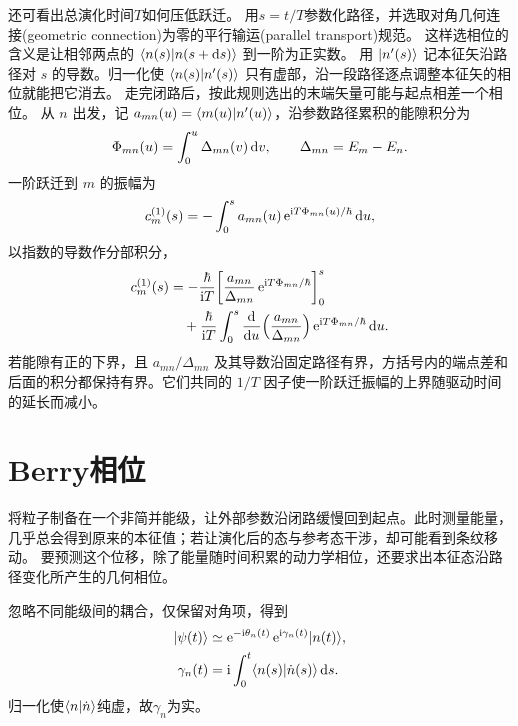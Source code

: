 还可看出总演化时间$T$如何压低跃迁。
用$s = t/T$参数化路径，并选取对角几何连接(geometric connection)为零的平行输运(parallel transport)规范。
这样选相位的含义是让相邻两点的 $\langle n(s)\vert n(s + \mathop{}\!\mathrm{d} s)\rangle$ 到一阶为正实数。
用 $\lvert n'(s)\rangle$ 记本征矢沿路径对 $s$ 的导数。归一化使 $\langle n(s)\vert n'(s)\rangle$ 只有虚部，沿一段路径逐点调整本征矢的相位就能把它消去。
走完闭路后，按此规则选出的末端矢量可能与起点相差一个相位。
从 $n$ 出发，记 $a_{mn}(u) = \langle m(u)\vert n'(u)\rangle$，沿参数路径累积的能隙积分为
\begin{equation}\label{eq:qm-integrated-energy-gap}
    \Phi_{mn}(u) = \int_0^u\Delta_{mn}(v)\mathop{}\!\mathrm{d} v,\qquad
    \Delta_{mn} = E_m - E_n.
\end{equation}
一阶跃迁到 $m$ 的振幅为
\begin{equation}
    c_m^{(1)}(s)
    = -\int_0^s a_{mn}(u)\mathop{}\!\mathrm{e}^{\mathrm{i} T\Phi_{mn}(u)/\hbar}\mathop{}\!\mathrm{d} u,
\end{equation}
以指数的导数作分部积分，
\begin{equation}
    \begin{alignedat}{1}
        c_m^{(1)}(s) &= -\frac{\hbar}{\mathrm{i} T}
            \biggl[\frac{a_{mn}}{\Delta_{mn}}
            \mathop{}\!\mathrm{e}^{\mathrm{i} T\Phi_{mn}/\hbar}\biggr]_0^s\\
        &\quad +\frac{\hbar}{\mathrm{i} T}
            \int_0^s\frac{\mathop{}\!\mathrm{d}^{}}{\mathrm{d}{u}^{}}\Bigl(\frac{a_{mn}}{\Delta_{mn}}\Bigr)
            \mathop{}\!\mathrm{e}^{\mathrm{i} T\Phi_{mn}/\hbar}\mathop{}\!\mathrm{d} u.
    \end{alignedat}
\end{equation}
若能隙有正的下界，且 $a_{mn}/\Delta_{mn}$ 及其导数沿固定路径有界，方括号内的端点差和后面的积分都保持有界。它们共同的 $1/T$ 因子使一阶跃迁振幅的上界随驱动时间的延长而减小。

\section{Berry相位}
将粒子制备在一个非简并能级，让外部参数沿闭路缓慢回到起点。此时测量能量，几乎总会得到原来的本征值；若让演化后的态与参考态干涉，却可能看到条纹移动。
要预测这个位移，除了能量随时间积累的动力学相位，还要求出本征态沿路径变化所产生的几何相位。

忽略不同能级间的耦合，仅保留对角项，得到
\begin{subequations}
    \begin{align}
        \lvert\psi(t)\rangle &\simeq
        \mathop{}\!\mathrm{e}^{-\mathrm{i}\theta_n(t)}\mathop{}\!\mathrm{e}^{\mathrm{i}\gamma_n(t)}\lvert n(t)\rangle,\\
        \gamma_n(t) &= \mathrm{i}\int_0^t\langle n(s)\vert\dot n(s)\rangle\mathop{}\!\mathrm{d} s.
    \end{align}
\end{subequations}
归一化使$\langle n\vert\dot n\rangle$纯虚，故$\gamma_n$为实。

